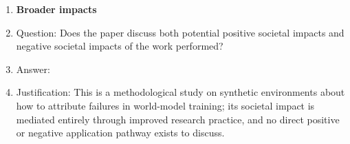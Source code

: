 \begin{enumerate}
\item {\bf Broader impacts}
    \item[] Question: Does the paper discuss both potential positive societal impacts and negative societal impacts of the work performed?
    \item[] Answer: \answerNA{}
    \item[] Justification: This is a methodological study on synthetic environments about how to attribute failures in world-model training; its societal impact is mediated entirely through improved research practice, and no direct positive or negative application pathway exists to discuss.

\end{enumerate}
